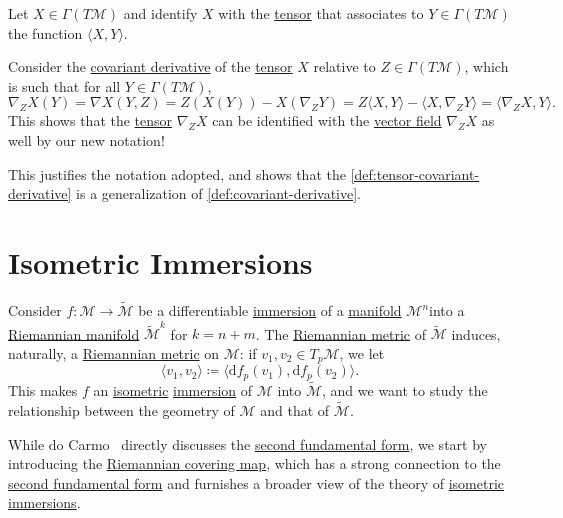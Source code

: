\begin{notation}
	Let \(X\in \Gamma (T \mathcal{M} )\) and identify \(X\) with the \hyperref[def:tensor]{tensor} that associates to \(Y\in \Gamma (T \mathcal{M} )\) the function \(\langle X, Y \rangle \).
\end{notation}

\begin{intuition}
	Consider the \hyperref[def:tensor-covariant-derivative]{covariant derivative} of the \hyperref[def:tensor]{tensor} \(X\) relative to \(Z\in \Gamma (T \mathcal{M} )\), which is such that for all \(Y\in \Gamma (T \mathcal{M} )\),
	\[
		\nabla _Z X(Y) = \nabla X(Y, Z) = Z(X(Y)) - X(\nabla _Z Y) = Z\langle X, Y \rangle - \langle X, \nabla _Z Y \rangle  = \langle \nabla _Z X, Y \rangle.
	\]
	This shows that the \hyperref[def:tensor]{tensor} \(\nabla _Z X\) can be identified with the \hyperref[def:vector-field]{vector field} \(\nabla _Z X\) as well by our new notation!
\end{intuition}

\begin{remark}
	This justifies the notation adopted, and shows that the \autoref{def:tensor-covariant-derivative} is a generalization of \autoref{def:covariant-derivative}.
\end{remark}

\chapter{Isometric Immersions}
Consider \(f\colon \mathcal{M} \to \widetilde{\mathcal{M}} \) be a differentiable \hyperref[def:immersion]{immersion} of a \hyperref[def:smooth-manifold]{manifold} \(\mathcal{M} ^n\)into a \hyperref[def:Riemannian-manifold]{Riemannian manifold} \(\widetilde{\mathcal{M}} ^{k}\) for \(k = n + m\). The \hyperref[def:Riemannian-metric]{Riemannian metric} of \(\widetilde{\mathcal{M}} \) induces, naturally, a \hyperref[def:Riemannian-metric]{Riemannian metric} on \(\mathcal{M} \): if \(v_1, v_2\in T_p \mathcal{M} \), we let
\[
	\langle v_1, v_2 \rangle \coloneqq \langle \mathrm{d} f_p(v_1), \mathrm{d} f_p(v_2) \rangle .
\]
This makes \(f\) an \hyperref[def:isometry]{isometric} \hyperref[def:immersion]{immersion} of \(\mathcal{M} \) into \(\widetilde{\mathcal{M}} \), and we want to study the relationship between the geometry of \(\mathcal{M} \) and that of \(\widetilde{\mathcal{M}} \).

While do Carmo~\cite{flaherty2013riemannian} directly discusses the \hyperref[def:2nd-fundamental-form]{second fundamental form}, we start by introducing the \hyperref[def:Riemannian-covering-map]{Riemannian covering map}, which has a strong connection to the \hyperref[def:2nd-fundamental-form]{second fundamental form} and furnishes a broader view of the theory of \hyperref[def:isometry]{isometric} \hyperref[def:immersion]{immersions}.

